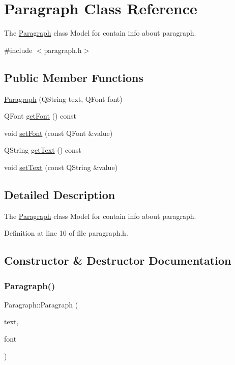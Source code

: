 \hypertarget{class_paragraph}{}\section{Paragraph Class Reference}
\label{class_paragraph}


The \hyperlink{class_paragraph}{Paragraph} class Model for contain info about paragraph.  




{\ttfamily \#include $<$paragraph.\+h$>$}

\subsection*{Public Member Functions}
\begin{DoxyCompactItemize}
\item 
\hyperlink{class_paragraph_acad2e234873847c33313f5a5f0a209f5}{Paragraph} (Q\+String text, Q\+Font font)
\item 
Q\+Font \hyperlink{class_paragraph_abc3bbbf36f4318623d483190b30e08a9}{get\+Font} () const
\item 
void \hyperlink{class_paragraph_ac1b3f012dcb54c04c252a48fda13a9fd}{set\+Font} (const Q\+Font \&value)
\item 
Q\+String \hyperlink{class_paragraph_aa05a7f3553a718ee03b4df6fdcd35d1a}{get\+Text} () const
\item 
void \hyperlink{class_paragraph_ae509ab5115df3836870de1cbc78029dd}{set\+Text} (const Q\+String \&value)
\end{DoxyCompactItemize}


\subsection{Detailed Description}
The \hyperlink{class_paragraph}{Paragraph} class Model for contain info about paragraph. 

Definition at line 10 of file paragraph.\+h.



\subsection{Constructor \& Destructor Documentation}
\mbox{\label{class_paragraph_acad2e234873847c33313f5a5f0a209f5}} 
\subsubsection{\texorpdfstring{Paragraph()}{Paragraph()}}
{\footnotesize\ttfamily Paragraph\+::\+Paragraph (\begin{DoxyParamCaption}\item[{Q\+String}]{text,  }\item[{Q\+Font}]{font }\end{DoxyParamCaption})}



